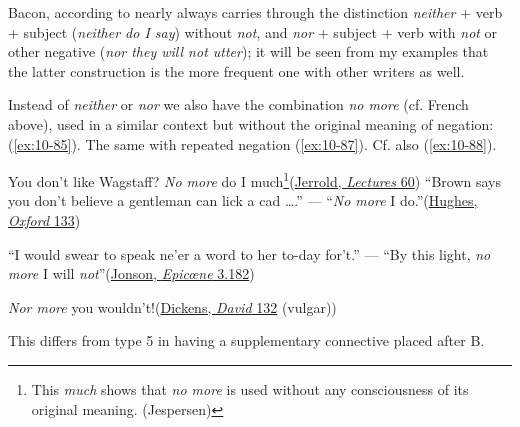 Bacon, according to \citet[85]{bogholm1906bacon} nearly always carries through the distinction \textit{neither} + verb + subject (\textit{neither do I say}) without \textit{not}, and \textit{nor} + subject + verb with \textit{not} or other negative (\textit{nor they will not utter}); it will be seen from my examples that the latter construction is the more frequent one with other writers as well.


Instead of \textit{neither} or \textit{nor} we also have the combination \textit{no more} (cf. French above), used in a similar context but without the original meaning of negation: (\ref{ex:10-85}). The same with repeated negation (\ref{ex:10-87}). Cf. also (\ref{ex:10-88}).

\ea \label{ex:10-85}
\ea
You don't like Wagstaff? \emph{No more} do I much\footnote{This \textit{much} shows that \textit{no more} is used without any consciousness of its original meaning. (Jespersen)}\hfill(\href{https://archive.org/details/mrscaudlescurtai00jerruoft/page/78/mode/2up?q=%22no+more+do+I+much%22&view=theater}{Jerrold, \textit{Lectures} 60}) %
\ex
``Brown says you don't believe a gentleman can lick a cad {\dots}.'' --- ``\emph{No more} I do.''\hfill(\href{https://archive.org/details/tombrownatoxford00hughiala/page/138/mode/2up?q=%22Brown+says+you+don%27t%22&view=theater}{Hughes, \textit{Oxford} 133}) %
\z
\z

\ea \label{ex:10-87}
``I would swear to speak ne'er a word to her to-day for't.'' --- ``By this light, \emph{no more} I will \emph{not}''\hfill(\href{https://archive.org/details/bim_eighteenth-century_epicne-or-the-silent-_jonson-ben_1776/page/n27/mode/2up?q=%22word+to+her%22&view=theater}{Jonson, \textit{Epicœne} 3.182}) %
\z

\ea \label{ex:10-88}
\emph{Nor more} you wouldn't!\hfill(\href{https://archive.org/details/personalhistory05dickgoog/page/n63/mode/2up?q=%22nor+more%22&view=theater}{Dickens, \textit{David} 132} (vulgar))
\z

This differs from type 5
in having a supplementary connective placed after B. 

